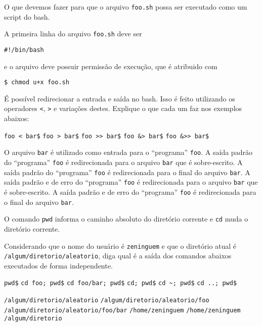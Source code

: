 \begin{Exercise}[label={0024}, difficulty={0}, origin={bash}]
  O que devemos fazer para que o arquivo \lstinline+foo.sh+ possa ser executado
  como um script do bash.
\end{Exercise}
\begin{Answer}[ref={0024}]
  A primeira linha do arquivo \lstinline+foo.sh+ deve ser
  \begin{lstlisting}
#!/bin/bash
  \end{lstlisting}
  e o arquivo deve possuir permissão de execução, que é atribuido com
  \begin{lstlisting}
$ chmod u+x foo.sh
  \end{lstlisting}
\end{Answer}

\begin{Exercise}[label={0025}, difficulty={0}, origin={bash}]
  É possível redirecionar a entrada e saída no bash. Isso é feito utilizando
  os operadores \lstinline+<+, \lstinline+>+ e variações destes.  Explique o que
  cada um faz nos exemplos abaixos:

  \Question \lstinline+foo < bar$+
  \Question \lstinline+foo > bar$+
  \Question \lstinline+foo >> bar$+
  \Question \lstinline+foo &> bar$+
  \Question \lstinline+foo &>> bar$+
\end{Exercise}
\begin{Answer}[ref={0025}]
  \Question O arquivo \lstinline+bar+ é utilizado como entrada para o
  ``programa'' \lstinline+foo+.
  \Question A saída padrão do ``programa'' \lstinline+foo+ é redirecionada para
  o arquivo \lstinline+bar+ que é sobre-escrito.
  \Question A saída padrão do ``programa'' \lstinline+foo+ é redirecionada para
  o final do arquivo \lstinline+bar+.
  \Question A saída padrão e de erro do ``programa'' \lstinline+foo+ é
  redirecionada para o arquivo \lstinline+bar+ que é sobre-escrito.
  \Question A saída padrão e de erro do ``programa'' \lstinline+foo+ é
  redirecionada para o final do arquivo \lstinline+bar+.
\end{Answer}

\begin{Exercise}[label={0026}, difficulty={0}, origin={bash}]
  O comando \lstinline+pwd+ informa o caminho absoluto do diretório corrente e
  \lstinline+cd+ muda o diretório corrente.

  Considerando que o nome do usuário é \lstinline+zeninguem+ e que o diretório
  atual é \lstinline+/algum/diretorio/aleatorio+, diga qual é a saída dos
  comandos abaixos executados de forma independente.

  \Question \lstinline+pwd$+
  \Question \lstinline+cd foo; pwd$+
  \Question \lstinline+cd foo/bar; pwd$+
  \Question \lstinline+cd; pwd$+
  \Question \lstinline+cd ~; pwd$+
  \Question \lstinline+cd ..; pwd$+
\end{Exercise}
\begin{Answer}[ref={0026}]
  \Question \lstinline+/algum/diretorio/aleatorio+
  \Question \lstinline+/algum/diretorio/aleatorio/foo+
  \Question \lstinline+/algum/diretorio/aleatorio/foo/bar+
  \Question \lstinline+/home/zeninguem+
  \Question \lstinline+/home/zeninguem+
  \Question \lstinline+/algum/diretorio+
\end{Answer}

